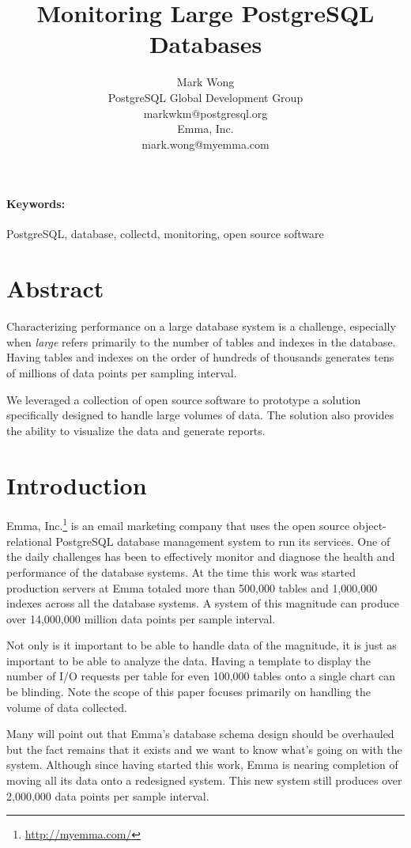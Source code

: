 \documentclass[twocolumn,letterpaper]{article}
\title{Monitoring Large PostgreSQL Databases}
\author{
  Mark Wong\\
  PostgreSQL Global Development Group\\
  markwkm@postgresql.org\\
  Emma, Inc.\\
  mark.wong@myemma.com
}
\date{}
\begin{document}
\maketitle

\paragraph{Keywords:} PostgreSQL, database, collectd, monitoring, open source
software

\section*{Abstract}

Characterizing performance on a large database system is a challenge,
especially when \textit{large} refers primarily to the number of tables and
indexes in the database.  Having tables and indexes on the order of hundreds of
thousands generates tens of millions of data points per sampling interval.

We leveraged a collection of open source software to prototype a solution
specifically designed to handle large volumes of data.  The solution also
provides the ability to visualize the data and generate reports.

\section{Introduction}

Emma, Inc.\footnote{\url{http://myemma.com/}} is an email marketing company
that uses the open source object-relational PostgreSQL database management
system to run its services.  One of the daily challenges has been to
effectively monitor and diagnose the health and performance of the database
systems.  At the time this work was started production servers at Emma totaled
more than 500,000 tables and 1,000,000 indexes across all the database systems.
A system of this magnitude can produce over 14,000,000 million data points per
sample interval.

Not only is it important to be able to handle data of the magnitude, it is just
as important to be able to analyze the data.  Having a template to display the
number of I/O requests per table for even 100,000 tables onto a single chart
can be blinding.  Note the scope of this paper focuses primarily on handling
the volume of data collected.

Many will point out that Emma's database schema design should be overhauled but
the fact remains that it exists and we want to know what's going on with the
system.  Although since having started this work, Emma is nearing completion of
moving all its data onto a redesigned system.  This new system still produces
over 2,000,000 data points per sample interval.
\end{document}

